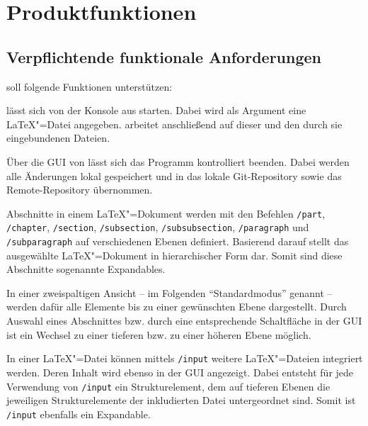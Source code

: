 \clearpage

\section{Produktfunktionen}
\label{sec:produktfunktionen}

\subsection{Verpflichtende funktionale Anforderungen}
\label{subsec:verpflichtende-funktionale-anforderungen}

\texla{} soll folgende Funktionen unterstützen:


\texla{} lässt sich von der Konsole aus starten.
Dabei wird als Argument eine \LaTeX"=Datei angegeben.
\texla{} arbeitet anschließend auf dieser und den durch sie eingebundenen Dateien.


Über die GUI von \texla{} lässt sich das Programm kontrolliert beenden.
Dabei werden alle Änderungen lokal gespeichert und in das lokale Git-Repository sowie das Remote-Repository übernommen.


Abschnitte in einem \LaTeX"=Dokument werden mit den Befehlen \verb|/part|, \verb|/chapter|, \verb|/section|,
\verb|/subsection|, \verb|/subsubsection|, \verb|/paragraph| und \verb|/subparagraph| auf verschiedenen Ebenen
definiert.
Basierend darauf stellt \texla{} das ausgewählte \LaTeX"=Dokument in hierarchischer Form dar.
Somit sind diese Abschnitte sogenannte Expandables.

In einer zweispaltigen Ansicht -- im Folgenden \enquote{Standardmodus} genannt -- werden dafür alle Elemente bis zu
einer gewünschten Ebene dargestellt.
Durch Auswahl eines Abschnittes bzw. durch eine entsprechende Schaltfläche in der GUI ist ein Wechsel zu einer tieferen
bzw. zu einer höheren Ebene möglich.


In einer \LaTeX"=Datei können mittels \verb|/input| weitere \LaTeX"=Dateien integriert werden.
Deren Inhalt wird ebenso in der GUI angezeigt.
Dabei entsteht für jede Verwendung von \verb|/input| ein Strukturelement, dem auf tieferen Ebenen die jeweiligen
Strukturelemente der inkludierten Datei untergeordnet sind.
Somit ist \verb|/input| ebenfalls ein Expandable.


